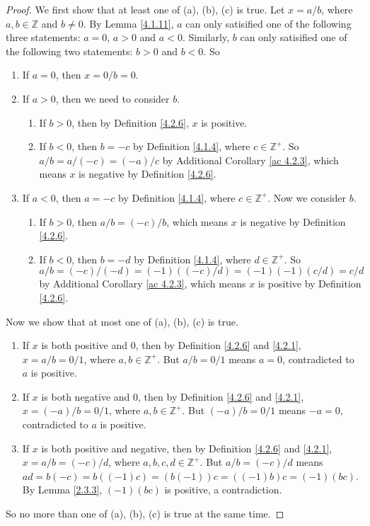 \begin{proof}
We first show that at least one of (a), (b), (c) is true.
Let \(x = a / b\), where \(a, b \in \mathds{Z}\) and \(b \neq 0\).
By Lemma \ref{4.1.11}, \(a\) can only satisified one of the following three statements:
\(a = 0\), \(a > 0\) and \(a < 0\).
Similarly, \(b\) can only satisified one of the following two statements:
\(b > 0\) and \(b < 0\).
So
\begin{enumerate}[label=(\Roman*)]
    \item If \(a = 0\), then \(x = 0 / b = 0\).
    \item If \(a > 0\), then we need to consider \(b\).
    \begin{enumerate}[label=(\roman*)]
        \item If \(b > 0\), then by Definition \ref{4.2.6}, \(x\) is positive.
        \item If \(b < 0\), then \(b = -c\) by Definition \ref{4.1.4}, where \(c \in \mathds{Z}^+\).
        So \(a / b = a / (-c) = (-a) / c\) by Additional Corollary \ref{ac 4.2.3}, which means \(x\) is negative by Definition \ref{4.2.6}.
    \end{enumerate}
    \item If \(a < 0\), then \(a = -c\) by Definition \ref{4.1.4}, where \(c \in \mathds{Z}^+\).
    Now we consider \(b\).
    \begin{enumerate}[label=(\roman*)]
        \item If \(b > 0\), then \(a / b = (-c) / b\), which means \(x\) is negative by Definition \ref{4.2.6}.
        \item If \(b < 0\), then \(b = -d\) by Definition \ref{4.1.4}, where \(d \in \mathds{Z}^+\).
        So \(a / b = (-c) / (-d) = (-1)((-c) / d) = (-1)(-1)(c / d) = c / d\) by Additional Corollary \ref{ac 4.2.3}, which means \(x\) is positive by Definition \ref{4.2.6}.
    \end{enumerate}
\end{enumerate}

Now we show that at most one of (a), (b), (c) is true.
\begin{enumerate}[label=(\Roman*)]
    \item If \(x\) is both positive and \(0\), then by Definition \ref{4.2.6} and \ref{4.2.1}, \(x = a / b = 0 / 1\), where \(a, b \in \mathds{Z}^+\).
    But \(a / b = 0 / 1\) means \(a = 0\), contradicted to \(a\) is positive.
    \item If \(x\) is both negative and \(0\), then by Definition \ref{4.2.6} and \ref{4.2.1}, \(x = (-a) / b = 0 / 1\), where \(a, b \in \mathds{Z}^+\).
    But \((-a) / b = 0 / 1\) means \(-a = 0\), contradicted to \(a\) is positive.
    \item If \(x\) is both positive and negative, then by Definition \ref{4.2.6} and \ref{4.2.1}, \(x = a / b = (-c) / d\), where \(a, b, c, d \in \mathds{Z}^+\).
    But \(a / b = (-c) / d\) means \(ad = b(-c) = b((-1)c) = (b(-1))c = ((-1)b)c = (-1)(bc)\).
    By Lemma \ref{2.3.3}, \((-1)(bc)\) is positive, a contradiction.
\end{enumerate}
So no more than one of (a), (b), (c) is true at the same time.
\end{proof}


